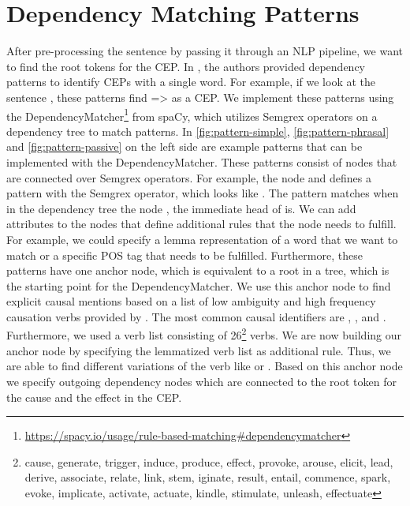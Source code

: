 \section{Dependency Matching Patterns}\label{sec:dependency-matching}
After pre-processing the sentence by passing it through an \ac{NLP} pipeline, we want to find the root tokens for the \ac{CEP}.
In \cite{doan2019extracting, sorgente2013automatic}, the authors provided dependency patterns to identify \ac{CEP}s with a single word.
For example, if we look at the sentence , these patterns find  =>  as a \ac{CEP}.
We implement these patterns using the DependencyMatcher\footnote{\url{https://spacy.io/usage/rule-based-matching\#dependencymatcher}} from spaCy, which utilizes Semgrex operators on a dependency tree to match patterns.
In \autoref{fig:pattern-simple}, \autoref{fig:pattern-phrasal} and \autoref{fig:pattern-passive} on the left side are example patterns that can be implemented with the DependencyMatcher.
These patterns consist of nodes that are connected over Semgrex operators.
For example, the node  and  defines a pattern with the \qq{>} Semgrex operator, which looks like .
The pattern matches when in the dependency tree the node , the immediate head of  is.
We can add attributes to the nodes that define additional rules that the node needs to fulfill.
For example, we could specify a lemma representation of a word that we want to match or a specific \ac{POS} tag that needs to be fulfilled.
Furthermore, these patterns have one anchor node, which is equivalent to a root in a tree, which is the starting point for the DependencyMatcher.
We use this anchor node to find explicit causal mentions based on a list of low ambiguity and high frequency causation verbs provided by \cite{girju2002text}.
The most common causal identifiers are , ,  and .
Furthermore, we used a verb list consisting of 26\footnote{cause, generate, trigger, induce, produce, effect, provoke, arouse, elicit, lead, derive, associate, relate, link, stem, iginate, result, entail, commence, spark, evoke, implicate, activate, actuate, kindle, stimulate, unleash, effectuate} verbs.
We are now building our anchor node by specifying the lemmatized verb list as additional rule.
Thus, we are able to find different variations of the verb  like  or .
Based on this anchor node we specify outgoing dependency nodes which are connected to the root token for the cause and the effect in the \ac{CEP}.

